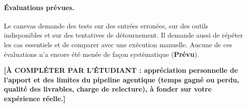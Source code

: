 \paragraph{Évaluations prévues.} Le canevas demande des tests sur des entrées erronées, sur des outils indisponibles et sur des tentatives de détournement. Il demande aussi de répéter les cas essentiels et de comparer avec une exécution manuelle. Aucune de ces évaluations n'a encore été menée de façon systématique (\textbf{Prévu}).

\textbf{[À COMPLÉTER PAR L'ÉTUDIANT : appréciation personnelle de l'apport et des limites du pipeline agentique (temps gagné ou perdu, qualité des livrables, charge de relecture), à fonder sur votre expérience réelle.]}
